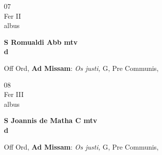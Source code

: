 \documentclass[10pt, openany]{book}
\begin{document}
        \begin{center}
            \begin{minipage}{3.5in}
                \vspace{2em}
                \begin{minipage}{0.5in}
                    {\Huge 07} \\
                    {\normalsize Fer II} \\
                    {\normalsize albus}
                \end{minipage}
                \begin{minipage}{3.0in}
                    \textbf{ \large S Romualdi Abb mtv \\
                    \textnormal{\normalsize d}} \\ 
                \end{minipage}
                \begin{justify}Off Ord, \textbf{Ad Missam}: \textit{Os justi,} G, Pre Communis,  
                \end{justify}
            \end{minipage}
        \end{center}
    
        \begin{center}
            \begin{minipage}{3.5in}
                \vspace{2em}
                \begin{minipage}{0.5in}
                    {\Huge 08} \\
                    {\normalsize Fer III} \\
                    {\normalsize albus}
                \end{minipage}
                \begin{minipage}{3.0in}
                    \textbf{ \large S Joannis de Matha C mtv \\
                    \textnormal{\normalsize d}} \\ 
                \end{minipage}
                \begin{justify}Off Ord, \textbf{Ad Missam}: \textit{Os justi,} G, Pre Communis,  
                \end{justify}
            \end{minipage}
        \end{center}
    
\end{document}
